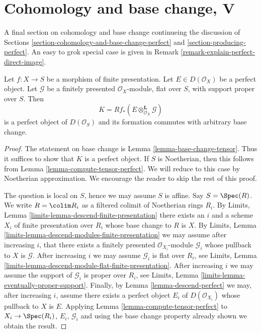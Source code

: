 \section{Cohomology and base change, V}
\label{section-cohomology-and-base-change-final}

\noindent
A final section on cohomology and base change continueing
the discussion of Sections
\ref{section-cohomology-and-base-change-perfect}
and \ref{section-producing-perfect}.
An easy to grok special case is given in
Remark \ref{remark-explain-perfect-direct-image}.

\begin{lemma}
\label{lemma-base-change-tensor-perfect}
Let $f : X \to S$ be a morphism of finite presentation.
Let $E \in D(\mathcal{O}_X)$ be a perfect object. Let $\mathcal{G}$ be a
finitely presented $\mathcal{O}_X$-module, flat over $S$, with support
proper over $S$. Then
$$
K = Rf_*(E \otimes_{\mathcal{O}_X}^\mathbf{L} \mathcal{G})
$$
is a perfect object of $D(\mathcal{O}_S)$ and its formation
commutes with arbitrary base change.
\end{lemma}

\begin{proof}
The statement on base change is Lemma \ref{lemma-base-change-tensor}.
Thus it suffices to show that $K$ is a perfect object. If $S$ is
Noetherian, then this follows from
Lemma \ref{lemma-compute-tensor-perfect}.
We will reduce to this case by Noetherian approximation.
We encourage the reader to skip the rest of this proof.

\medskip\noindent
The question is local on $S$, hence we may assume $S$ is affine.
Say $S = \Spec(R)$. We write $R = \colim R_i$ as a filtered colimit
of Noetherian rings $R_i$. By Limits, Lemma
\ref{limits-lemma-descend-finite-presentation}
there exists an $i$ and a scheme $X_i$ of finite presentation over $R_i$
whose base change to $R$ is $X$. By
Limits, Lemma \ref{limits-lemma-descend-modules-finite-presentation}
we may assume after increasing $i$, that there exists a finitely
presented $\mathcal{O}_{X_i}$-module $\mathcal{G}_i$ whose
pullback to $X$ is $\mathcal{G}$. After increasing $i$
we may assume $\mathcal{G}_i$ is flat over $R_i$, see
Limits, Lemma \ref{limits-lemma-descend-module-flat-finite-presentation}.
After increasing $i$ we may assume the support of $\mathcal{G}_i$
is proper over $R_i$, see
Limits, Lemma \ref{limits-lemma-eventually-proper-support}.
Finally, by Lemma \ref{lemma-descend-perfect}
we may, after increasing $i$, assume there exists a perfect
object $E_i$ of $D(\mathcal{O}_{X_i})$ whose pullback to
$X$ is $E$. Applying Lemma \ref{lemma-compute-tensor-perfect}
to $X_i \to \Spec(R_i)$, $E_i$, $\mathcal{G}_i$ and using the
base change property already shown we obtain the result.
\end{proof}

